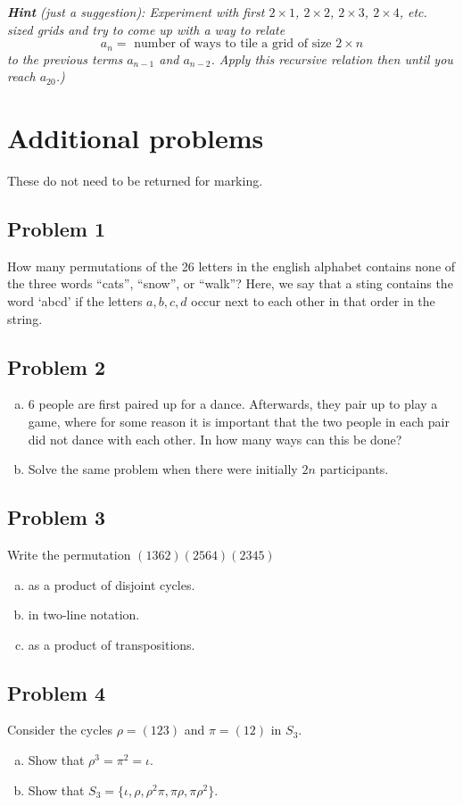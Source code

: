 \documentclass{amsart}
\theoremstyle{definition} \newtheorem*{definition}{Definition}
\theoremstyle{remark} \newtheorem*{ex}{Example}
\begin{document}
\textit{\textbf{Hint} (just a suggestion): Experiment with first $2\times 1$, $2 \times 2$, $2\times 3$, $2\times 4$, etc. sized grids and try to come up with a way to relate
$$a_n = \text{ number of ways to tile a grid of size } 2 \times n$$
to the previous terms $a_{n-1}$ and $a_{n-2}$. Apply this recursive relation then until you reach $a_{20}$.)}



\section*{Additional problems}

These do not need to be returned for marking.

\subsection*{Problem 1}
How many permutations of the 26 letters in the english alphabet contains none of the three words ``cats'', ``snow'', or ``walk''? Here, we say that a sting contains the word `abcd' if the letters $a,b,c, d$ occur next to each other in that order in the string. 

\subsection*{Problem 2}
\begin{enumerate}[a)]
\item $6$ people are first paired up for a dance. Afterwards, they pair up to play a game, where for some reason it is important that the two people in each pair did not dance with each other. In how many ways can this be done?
\item Solve the same problem when there were initially $2n$ participants.
\end{enumerate}

\subsection*{Problem 3}
Write the permutation $( 1 3 6 2 ) ( 2 5 6 4 ) ( 2 3 4 5 )$ \begin{enumerate}[a)]\item as a product of disjoint cycles. \item in two-line notation. \item as a product of transpositions. \end{enumerate}

\subsection*{Problem 4}
Consider the cycles $\rho=( 1 2 3 )$ and $\pi =( 1 2 )$ in $S_3$. \begin{enumerate}[a)]\item Show that
$\rho^3=\pi^2=\iota$. \item Show that $S_3= \{\iota, \rho, \rho^2 \pi, \pi\rho, \pi\rho^2\}$.\end{enumerate}
\end{document}
